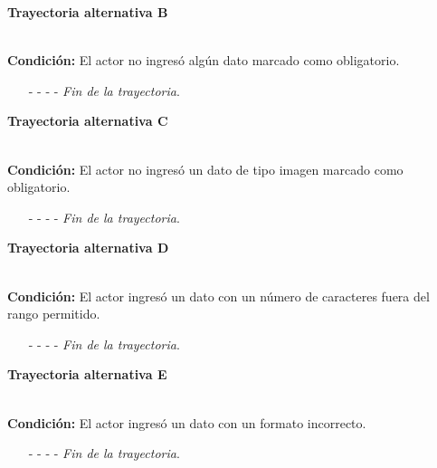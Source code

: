 \hypertarget{CU11-2:TAB}{\textbf{Trayectoria alternativa B}}\\
\noindent \textbf{Condición:} El actor no ingresó algún dato marcado como obligatorio.
\begin{enumerate}
	\UCpaso[\UCsist] Muestra el mensaje  señalando el campo que presenta el error en la pantalla .
	\UCpaso Regresa al paso \ref{CU11.2-P5} de la trayectoria principal.
	\item[- -] - - {\em {Fin de la trayectoria}}.%
\end{enumerate}
\hypertarget{CU11-2:TAC}{\textbf{Trayectoria alternativa C}}\\
\noindent \textbf{Condición:} El actor no ingresó un dato de tipo imagen marcado como obligatorio.
\begin{enumerate}
	\UCpaso[\UCsist] Muestra el mensaje  señalando el campo que presenta el error en la pantalla .
	\UCpaso Regresa al paso \ref{CU11.1-P3} de la trayectoria principal.
	\item[- -] - - {\em {Fin de la trayectoria}}.%
\end{enumerate}
\hypertarget{CU11-2:TAD}{\textbf{Trayectoria alternativa D}}\\
\noindent \textbf{Condición:} El actor ingresó un dato con un número de caracteres fuera del rango permitido.
\begin{enumerate}
	\UCpaso[\UCsist] Muestra el mensaje  señalando el campo que presenta el error en la pantalla .
	\UCpaso Regresa al paso \ref{CU11.2-P5} de la trayectoria principal.
	\item[- -] - - {\em {Fin de la trayectoria}}.%
\end{enumerate}
\hypertarget{CU11-2:TAE}{\textbf{Trayectoria alternativa E}}\\
\noindent \textbf{Condición:} El actor ingresó un dato con un formato incorrecto.
\begin{enumerate}
	\UCpaso[\UCsist] Muestra el mensaje  señalando el campo que presenta el error en la pantalla .
	\UCpaso Regresa al paso \ref{CU11.2-P5} de la trayectoria principal.
	\item[- -] - - {\em {Fin de la trayectoria}}.
\end{enumerate}
